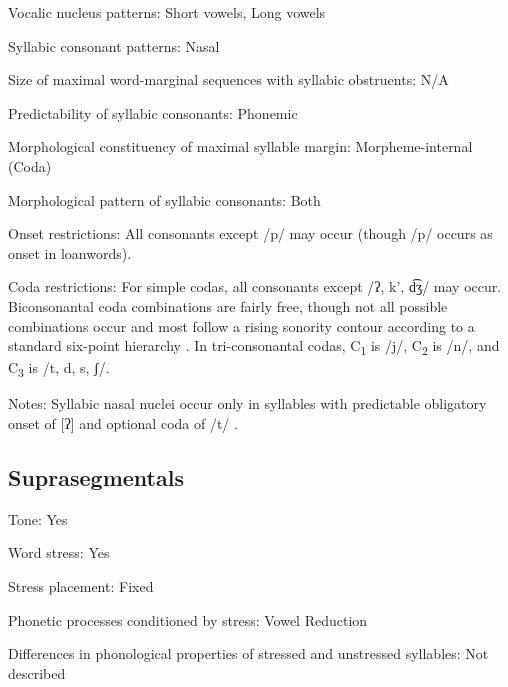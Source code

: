 {\begin{appendixdesc}
\item[Vocalic nucleus patterns:] Short vowels, Long vowels

\item[Syllabic consonant patterns:] Nasal

\item[Size of maximal word-marginal sequences with syllabic obstruents:] N/A

\item[Predictability of syllabic consonants:] Phonemic

\item[Morphological constituency of maximal syllable margin:] Morpheme-internal (Coda)

\item[Morphological pattern of syllabic consonants:] Both

\item[Onset restrictions:] All consonants except /p/ may occur (though /p/ occurs as onset in loanwords).

\item[Coda restrictions:] For simple codas, all consonants except /ʔ, k’, d͡ʒ/ may occur. Biconsonantal coda combinations are fairly free, though not all possible combinations occur and most follow a rising sonority contour according to a standard six-point hierarchy . In tri-consonantal codas, C\textsubscript{1} is /j/, C\textsubscript{2} is /n/, and C\textsubscript{3} is /t, d, s, ʃ/.

\item[Notes:] Syllabic nasal nuclei occur only in syllables with predictable obligatory onset of [ʔ] and optional coda of /t/ \citep[41]{Beachy2005}.
\end{appendixdesc}
\subsection*{Suprasegmentals}
\begin{appendixdesc}
\item[Tone:] Yes

\item[Word stress:] Yes

\item[Stress placement:] Fixed

\item[Phonetic processes conditioned by stress:] Vowel Reduction

\item[Differences in phonological properties of stressed and unstressed syllables:] Not described


\end{appendixdesc}}

